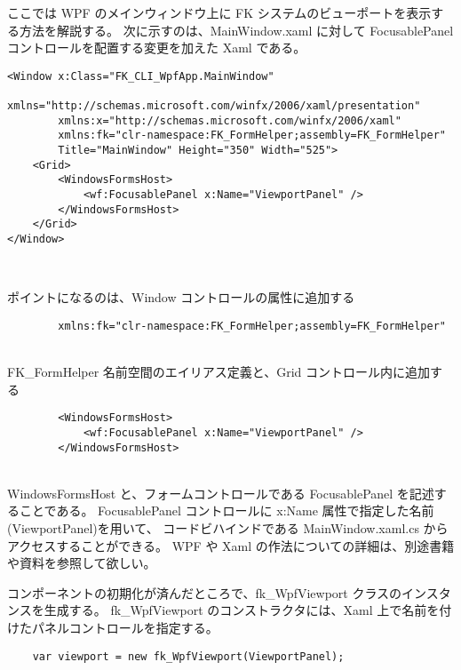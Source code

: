 ここでは WPF のメインウィンドウ上に FK システムのビューポートを表示する方法を解説する。
次に示すのは、MainWindow.xaml に対して FocusablePanel コントロールを配置する変更を加えた Xaml である。
\\
\begin{screen}
\begin{verbatim}
<Window x:Class="FK_CLI_WpfApp.MainWindow"
        xmlns="http://schemas.microsoft.com/winfx/2006/xaml/presentation"
        xmlns:x="http://schemas.microsoft.com/winfx/2006/xaml"
        xmlns:fk="clr-namespace:FK_FormHelper;assembly=FK_FormHelper"
        Title="MainWindow" Height="350" Width="525">
    <Grid>
        <WindowsFormsHost>
            <wf:FocusablePanel x:Name="ViewportPanel" />
        </WindowsFormsHost>
    </Grid>
</Window>
\end{verbatim}
\end{screen}
~

ポイントになるのは、Window コントロールの属性に追加する
\\
\begin{screen}
\begin{verbatim}
        xmlns:fk="clr-namespace:FK_FormHelper;assembly=FK_FormHelper"
\end{verbatim}
\end{screen}
~ \\
FK_FormHelper 名前空間のエイリアス定義と、Grid コントロール内に追加する
\\
\begin{screen}
\begin{verbatim}
        <WindowsFormsHost>
            <wf:FocusablePanel x:Name="ViewportPanel" />
        </WindowsFormsHost>
\end{verbatim}
\end{screen}
~ \\
WindowsFormsHost と、フォームコントロールである FocusablePanel を記述することである。
FocusablePanel コントロールに x:Name 属性で指定した名前(ViewportPanel)を用いて、
コードビハインドである MainWindow.xaml.cs からアクセスすることができる。
WPF や Xaml の作法についての詳細は、別途書籍や資料を参照して欲しい。

コンポーネントの初期化が済んだところで、fk\_WpfViewport クラスのインスタンスを生成する。
fk\_WpfViewport のコンストラクタには、Xaml 上で名前を付けたパネルコントロールを指定する。
\\
\begin{screen}
\begin{verbatim}
    var viewport = new fk_WpfViewport(ViewportPanel);
\end{verbatim}
\end{screen}
~

